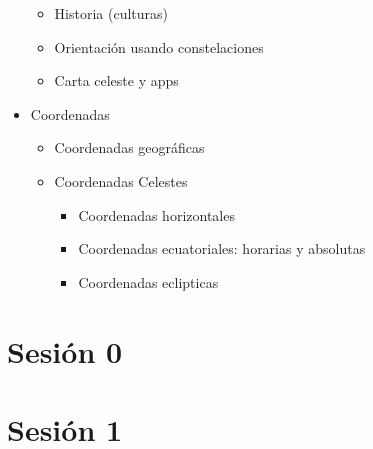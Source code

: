 \documentclass[10pt,a4paper]{article}
\begin{document}
\begin{itemize}
\begin{itemize}
  \item Historia (culturas)
  \item Orientación usando constelaciones 
  \item Carta celeste y apps
 \end{itemize}
\item Coordenadas 
 \begin{itemize}
  \item Coordenadas geográficas 
  \item Coordenadas Celestes
   \begin{itemize}
    \item Coordenadas horizontales
    \item Coordenadas ecuatoriales: horarias y absolutas
    \item Coordenadas eclipticas 
   \end{itemize}
 \end{itemize}
\end{itemize}


\section{Sesión 0}

\section{Sesión 1}
\end{document}
